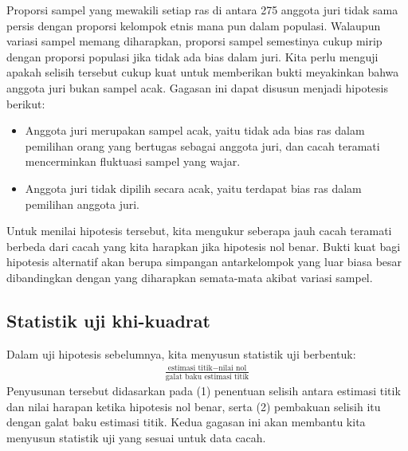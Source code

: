 Proporsi sampel yang mewakili setiap ras di antara 275 anggota juri tidak sama persis dengan proporsi kelompok etnis mana pun dalam populasi. Walaupun variasi sampel memang diharapkan, proporsi sampel semestinya cukup mirip dengan proporsi populasi jika tidak ada bias dalam juri. Kita perlu menguji apakah selisih tersebut cukup kuat untuk memberikan bukti meyakinkan bahwa anggota juri bukan sampel acak. Gagasan ini dapat disusun menjadi hipotesis berikut:
\begin{itemize}
\setlength{\itemsep}{0mm}
\item[$H_0$:] Anggota juri merupakan sampel acak, yaitu tidak ada bias ras dalam pemilihan orang yang bertugas sebagai anggota juri, dan cacah teramati mencerminkan fluktuasi sampel yang wajar.
\item[$H_A$:] Anggota juri tidak dipilih secara acak, yaitu terdapat bias ras dalam pemilihan anggota juri.
\end{itemize}
Untuk menilai hipotesis tersebut, kita mengukur seberapa jauh cacah teramati berbeda dari cacah yang kita harapkan jika hipotesis nol benar. Bukti kuat bagi hipotesis alternatif akan berupa simpangan antarkelompok yang luar biasa besar dibandingkan dengan yang diharapkan semata-mata akibat variasi sampel.


\subsection{Statistik uji khi-kuadrat}
\label{chiSquareTestStatistic}

Dalam uji hipotesis sebelumnya, kita menyusun statistik uji berbentuk:
\begin{align*}
\frac{\text{estimasi titik} - \text{nilai nol}}
    {\text{galat baku estimasi titik}}
\end{align*}
Penyusunan tersebut didasarkan pada (1) penentuan selisih antara estimasi titik dan nilai harapan ketika hipotesis nol benar, serta (2) pembakuan selisih itu dengan galat baku estimasi titik. Kedua gagasan ini akan membantu kita menyusun statistik uji yang sesuai untuk data cacah.

